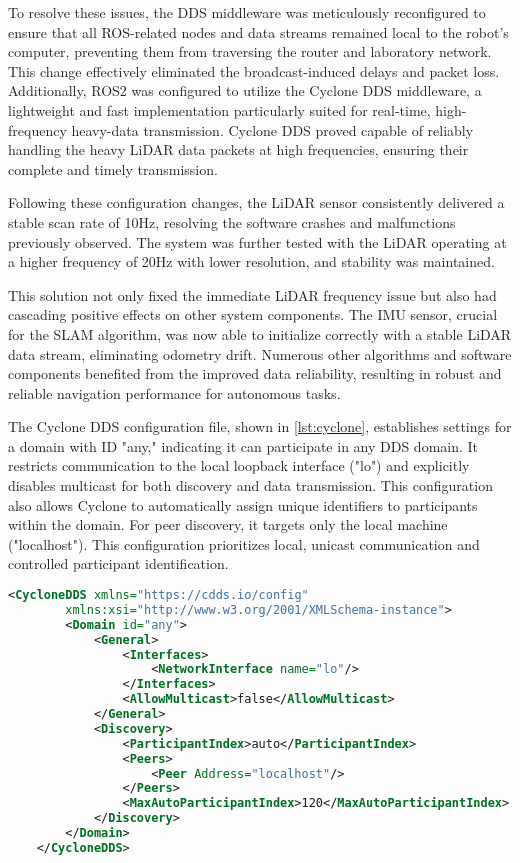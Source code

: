 To resolve these issues, the DDS middleware was meticulously reconfigured to ensure that all ROS-related nodes
and data streams remained local to the robot's computer, preventing them from traversing the router and laboratory network.
This change effectively eliminated the broadcast-induced delays and packet loss.  Additionally, ROS2 was configured
to utilize the Cyclone DDS middleware, a lightweight and fast implementation particularly suited for real-time, 
high-frequency heavy-data transmission. Cyclone DDS proved capable of reliably handling the heavy LiDAR data packets
at high frequencies, ensuring their complete and timely transmission.

Following these configuration changes, the LiDAR sensor consistently delivered a stable scan rate of 10Hz,
resolving the software crashes and malfunctions previously observed. The system was further tested with the
LiDAR operating at a higher frequency of 20Hz with lower resolution, and stability was maintained.

This solution not only fixed the immediate LiDAR frequency issue but also had cascading positive effects on other
system components. The IMU sensor, crucial for the SLAM algorithm, was now able to initialize correctly with a stable
LiDAR data stream, eliminating odometry drift. Numerous other algorithms and software components benefited from the 
improved data reliability, resulting in robust and reliable navigation performance for autonomous tasks.

The Cyclone DDS configuration file, shown in \ref{lst:cyclone}, establishes settings for a domain with ID "any,"
indicating it can participate in any DDS domain. It restricts communication to the local loopback interface ("lo") 
and explicitly disables multicast for both discovery and data transmission. This configuration also allows
Cyclone to automatically assign unique identifiers to participants within the domain. 
For peer discovery, it targets only the local machine ("localhost").
This configuration prioritizes local, unicast communication and controlled participant identification.

\begin{lstlisting}[language=XML, caption=Cyclone DDS configuration file, label=lst:cyclone, float=t]
    <CycloneDDS xmlns="https://cdds.io/config" 
        xmlns:xsi="http://www.w3.org/2001/XMLSchema-instance">
        <Domain id="any">
            <General>
                <Interfaces>
                    <NetworkInterface name="lo"/>
                </Interfaces>
                <AllowMulticast>false</AllowMulticast>
            </General>
            <Discovery>
                <ParticipantIndex>auto</ParticipantIndex>
                <Peers>
                    <Peer Address="localhost"/>
                </Peers>
                <MaxAutoParticipantIndex>120</MaxAutoParticipantIndex>
            </Discovery>
        </Domain>
    </CycloneDDS>
\end{lstlisting}


